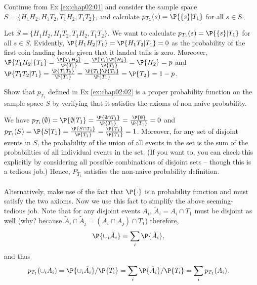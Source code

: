 	\begin{exercise}\label{ex:chap02:02}
		Continue from Ex \ref{ex:chap02:01} and consider the sample space $S=\{H_1H_2, H_1T_2, T_1H_2, T_1T_2\}$, and calculate 
		$p_{T_1}(s)=\P{\{s\}|T_1}$ for all $s\in S$.  

		\begin{solution}
			Let $S = \{H_1H_2, H_1T_2, T_1H_2, T_1T_2\}$. We want to calculate $p_{T_1}(s) = \P{\{s\}|T_1}$ for all $s \in S$. Evidently, $\P{H_1H_2 | T_1} = \P{H_1T_2 | T_1} = 0$ as the probability of the first coin landing heads given that it landed tails is zero. Moreover, $\P{T_1H_2 | \{T_1} = \frac{\P{T_1H_2}}{\P{T_1}} = \frac{\P{T_1} \P{H_2}}{\P{T_1}} = \P{H_2} = p$ and $\P{T_1T_2 | T_1} = \frac{\P{T_1T_2}}{\P{T_1}} = \frac{\P{T_1} \P{T_2}}{\P{T_1}} = \P{T_2} = 1 - p$.
		\end{solution}
	\end{exercise}
	
	\begin{exercise}\label{ex:chap02:03}
		Show that $p_{T_1}$ defined in Ex \ref{ex:chap02:02} is a proper probability function on the sample space $S$ by verifying that it satisfies the axioms of non-naive probability. 
		\begin{solution}
			We have $p_{T_1}(\emptyset) = \P{\emptyset | T_1} = \frac{\P{\emptyset \cap T_1}}{\P{T_1}} = \frac{\P{\emptyset}}{\P{T_1}} = 0$ and $p_{T_1}(S) = \P{S | T_1} = \frac{\P{S \cap T_1}}{\P{T_1}} = \frac{\P{T_1}}{\P{T_1}} = 1$. Moreover, for any set of disjoint events in $S$, the probability of the union of all events in the set is the sum of the probabilities of all individual events in the set. (If you want to, you can check this explicitly by considering all possible combinations of disjoint sets -- though this is a tedious job.) Hence, $P_{T_1}$ satisfies the non-naive probability definition.\\~\\
			Alternatively, make use of the fact that $\P{\cdot}$ is a probability function and must satisfy the two axioms. Now we use this fact to simplify the above seeming-tedious job. Note that for any disjoint events $A_i$, $\tilde{A}_i=A_i\cap T_1$ must be disjoint as well (why? because $\tilde{A}_i\cap \tilde{A}_j=(A_i\cap A_j)\cap T_1$) therefore, $$\P{\cup_i \tilde{A}_i}=\sum_i \P{\tilde{A}_i},$$ and thus $$p_{T_1}{(\cup_i A_i)}= \P{\cup_i \tilde{A}_i} /\P{T_i}=\sum_i \P{\tilde{A}_i}/\P{T_i}=\sum_i p_{T_1}{(A_i)}.$$
		\end{solution}
	\end{exercise}
	
